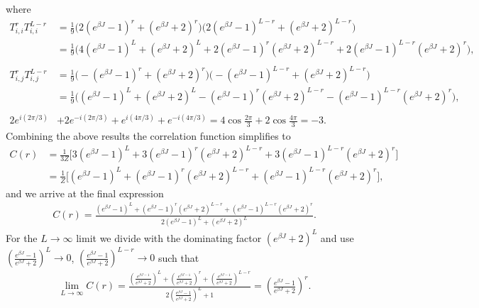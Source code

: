 \documentclass[reprint, amsmath, amssymb, aps, onecolumn]{revtex4-2}
\begin{document}
where 
\begin{align*}
  T_{i,i}^rT_{i,i}^{L-r} &= \frac{1}{9} \Big( 2(e^{\beta J} - 1)^r + (e^{\beta J} + 2)^r \Big)\Big(2(e^{\beta J} - 1)^{L-r} + (e^{\beta J} + 2)^{L-r}\Big)  \\
  &= \frac{1}{9}\Big(4(e^{\beta J} - 1)^L + (e^{\beta J} + 2)^L + 2(e^{\beta J} - 1)^r(e^{\beta J} + 2)^{L-r} + 2(e^{\beta J} - 1)^{L-r}(e^{\beta J} + 2)^{r}  \Big), \\ 
  \\
  T_{i,j}^rT_{i,j}^{L-r} &= \frac{1}{9}\Big( -(e^{\beta J} - 1)^r + (e^{\beta J} + 2)^r \Big) \Big( -(e^{\beta J} - 1)^{L-r} + (e^{\beta J} + 2)^{L-r} \Big) \\
  &= \frac{1}{9}\Big( (e^{\beta J} - 1)^L + (e^{\beta J} + 2)^L - (e^{\beta J} - 1)^r(e^{\beta J} + 2)^{L-r} - (e^{\beta J} - 1)^{L-r}(e^{\beta J} + 2)^{r}
    \Big), \\
  \\
  2e^{i(2\pi/3)} &+ 2e^{-i(2\pi/3)} + e^{i(4\pi/3)} + e^{-i(4\pi/3)} =  4\cos{\frac{2\pi}{3}} + 2\cos{\frac{4\pi}{3}} = -3.
\end{align*}
Combining the above results the correlation function simplifies to
\begin{align*}
  C(r) &= \frac{1}{3Z}\Big[ 3(e^{\beta J} - 1)^L + 3(e^{\beta J} - 1)^r(e^{\beta J} + 2)^{L-r} +  3(e^{\beta J} - 1)^{L-r}(e^{\beta J} + 2)^{r} \Big] \\
  &= \frac{1}{Z}\Big[ (e^{\beta J} - 1)^L + (e^{\beta J} - 1)^r(e^{\beta J} + 2)^{L-r} +  (e^{\beta J} - 1)^{L-r}(e^{\beta J} + 2)^{r} \Big],
\end{align*}
and we arrive at the final expression 
\begin{align}
  C(r) = \frac{(e^{\beta J} - 1)^L + (e^{\beta J} - 1)^r(e^{\beta J} + 2)^{L-r} +  (e^{\beta J} - 1)^{L-r}(e^{\beta J} + 2)^{r} }{2(e^{\beta J} - 1)^L + ( e^{\beta J} + 2)^L}.
  \label{eq:Cr_fin_L}
\end{align}
For the $L\to \infty$ limit we divide with the dominating factor $(e^{\beta J} + 2)^L$ and use $\left(\frac{e^{\beta J} - 1}{e^{\beta J} + 2}\right)^L \to 0$, $\left(\frac{e^{\beta J} - 1}{e^{\beta J} + 2}\right)^{L-r} \to 0$ such that
\begin{align}
  \lim_{L\to\infty} C(r) = \frac{\left(\frac{e^{\beta J - 1}}{e^{\beta J} + 2}\right)^L + \left(\frac{e^{\beta J - 1}}{e^{\beta J} + 2}\right)^r + \left(\frac{e^{\beta J - 1}}{e^{\beta J} + 2}\right)^{L-r}}{2\left(\frac{e^{\beta J} - 1}{e^{\beta J} + 2}\right)^L + 1} = \left(\frac{e^{\beta J} - 1}{e^{\beta J} + 2}\right)^r.
  \label{eq:Cr_inf_L}
\end{align}
\end{document}
